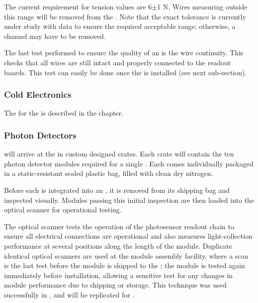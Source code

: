 The current requirement for tension values are 6$\pm$1 N. Wires measuring outside this range will be removed from the . Note that the exact tolerance is currently under study with  data to ensure the required acceptable range; otherwise, a channel may have to be removed.

The last test performed to ensure the quality of an  is the wire continuity. This checks that all wires are still intact and properly connected to the readout boards. This test can easily be done once the  is installed (see next sub-section).    
\subsubsection{Cold Electronics}
The  for the  is described in the  chapter.

\subsubsection{Photon Detectors}

 will arrive at the  in custom designed crates.  Each crate will contain the ten photon detector modules required for a single .  
Each  comes individually packaged in a static-resistant sealed plastic bag, filled with clean dry nitrogen.

Before each  is integrated into an , it is removed from its shipping bag and inspected visually. 
Modules passing this initial inspection are then loaded into the optical scanner for operational testing.

The  optical scanner tests the operation of the photosensor readout chain to ensure all electrical connections are operational and also measures light-collection performance at several positions along the length of the module.  
Duplicate identical optical scanners are used at the module assembly facility, where a scan is the last  test before the module is shipped to the ; the module is tested again immediately before installation, allowing a sensitive test for any changes in module performance due to shipping or storage.  
This technique was used successfully in , and will be replicated for .

